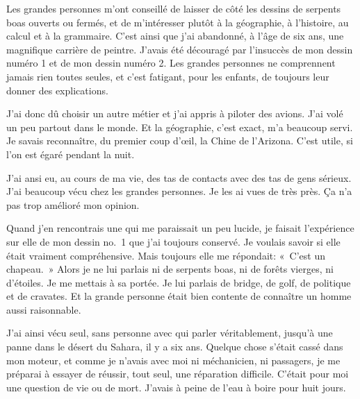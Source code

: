 \documentclass[a4paper]{report}
\begin{document}

Les grandes personnes m'ont conseillé de laisser de côté les dessins de serpents boas ouverts ou fermés, et de m'intéresser plutôt à la géographie, à l'histoire, au calcul et à la grammaire. C'est ainsi que j'ai abandonné, à l'âge de six ans, une magnifique carrière de peintre. J'avais été découragé par l'insuccès de mon dessin numéro 1 et de mon dessin numéro 2. Les grandes personnes ne comprennent jamais rien toutes seules, et c'est fatigant, pour les enfants, de toujours leur donner des explications.

J'ai donc dû choisir un autre métier et j'ai appris à piloter des avions. J'ai volé un peu partout dans le monde. Et la géographie, c'est exact, m'a beaucoup servi. Je savais reconnaître, du premier coup d'œil, la Chine de l'Arizona. C'est utile, si l'on est égaré pendant la nuit.

J'ai ansi eu, au cours de ma vie, des tas de contacts avec des tas de gens sérieux.
J'ai beaucoup vécu chez les grandes personnes.
Je les ai vues de très près.
Ça n'a pas trop amélioré mon opinion.

Quand j'en rencontrais une qui me paraissait un peu lucide, je faisait l'expérience sur elle de mon dessin no.~1 que j'ai toujours conservé. Je voulais savoir si elle était vraiment compréhensive. Mais toujours elle me répondait: «~C'est un chapeau.~» Alors je ne lui parlais ni de serpents boas, ni de forêts vierges, ni d'étoiles. Je me mettais à sa portée. Je lui parlais de bridge, de golf, de politique et de cravates. Et la grande personne était bien contente de connaître un homme aussi raisonnable.

\parachapter[II]{} %
J'ai ainsi vécu seul, sans personne avec qui parler véritablement, jusqu'à une panne dans le désert du Sahara, il y a six ans. Quelque chose s'était cassé dans mon moteur, et comme je n'avais avec moi ni méchanicien, ni passagers, je me préparai à essayer de réussir, tout seul, une réparation difficile. C'était pour moi une question de vie ou de mort. J'avais à peine de l'eau à boire pour huit jours.
\end{document}
